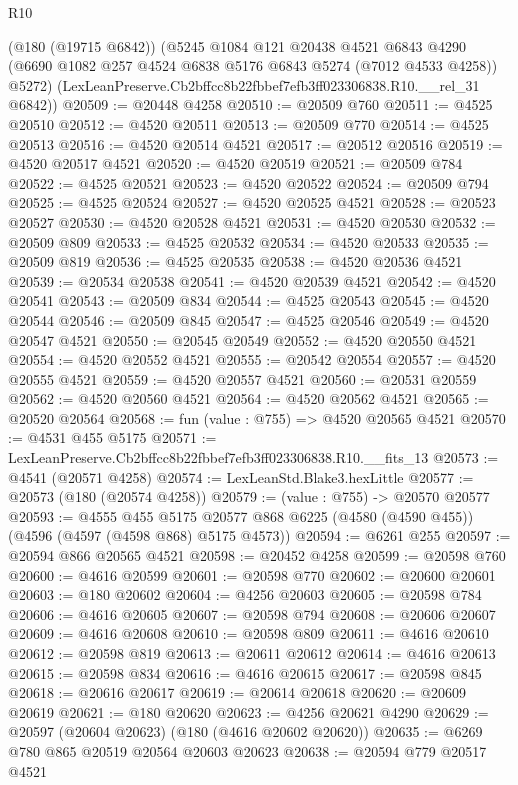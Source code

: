 \begin{lexlean}{R10}
\begin{coremodule}
      (@180 (@19715 @6842))
      (@5245
        @1084
        @121
        @20438
        @4521
        @6843
        @4290
        (@6690 @1082 @257 @4524 @6838 @5176 @6843 @5274 (@7012 @4533 @4258))
        @5272)
      (LexLeanPreserve.Cb2bffcc8b22fbbef7efb3ff023306838.R10.__rel_31 @6842))
@20509 := @20448 @4258
@20510 := @20509 @760
@20511 := @4525 @20510
@20512 := @4520 @20511
@20513 := @20509 @770
@20514 := @4525 @20513
@20516 := @4520 @20514 @4521
@20517 := @20512 @20516
@20519 := @4520 @20517 @4521
@20520 := @4520 @20519
@20521 := @20509 @784
@20522 := @4525 @20521
@20523 := @4520 @20522
@20524 := @20509 @794
@20525 := @4525 @20524
@20527 := @4520 @20525 @4521
@20528 := @20523 @20527
@20530 := @4520 @20528 @4521
@20531 := @4520 @20530
@20532 := @20509 @809
@20533 := @4525 @20532
@20534 := @4520 @20533
@20535 := @20509 @819
@20536 := @4525 @20535
@20538 := @4520 @20536 @4521
@20539 := @20534 @20538
@20541 := @4520 @20539 @4521
@20542 := @4520 @20541
@20543 := @20509 @834
@20544 := @4525 @20543
@20545 := @4520 @20544
@20546 := @20509 @845
@20547 := @4525 @20546
@20549 := @4520 @20547 @4521
@20550 := @20545 @20549
@20552 := @4520 @20550 @4521
@20554 := @4520 @20552 @4521
@20555 := @20542 @20554
@20557 := @4520 @20555 @4521
@20559 := @4520 @20557 @4521
@20560 := @20531 @20559
@20562 := @4520 @20560 @4521
@20564 := @4520 @20562 @4521
@20565 := @20520 @20564
@20568 := fun (value : @755) => @4520 @20565 @4521
@20570 := @4531 @455 @5175
@20571 := LexLeanPreserve.Cb2bffcc8b22fbbef7efb3ff023306838.R10.__fits_13
@20573 := @4541 (@20571 @4258)
@20574 := LexLeanStd.Blake3.hexLittle
@20577 := @20573 (@180 (@20574 @4258))
@20579 := (value : @755) -> @20570 @20577
@20593 := @4555
    @455
    @5175
    @20577
    @868
    @6225
    (@4580 (@4590 @455))
    (@4596 (@4597 (@4598 @868) @5175 @4573))
@20594 := @6261 @255
@20597 := @20594 @866 @20565 @4521
@20598 := @20452 @4258
@20599 := @20598 @760
@20600 := @4616 @20599
@20601 := @20598 @770
@20602 := @20600 @20601
@20603 := @180 @20602
@20604 := @4256 @20603
@20605 := @20598 @784
@20606 := @4616 @20605
@20607 := @20598 @794
@20608 := @20606 @20607
@20609 := @4616 @20608
@20610 := @20598 @809
@20611 := @4616 @20610
@20612 := @20598 @819
@20613 := @20611 @20612
@20614 := @4616 @20613
@20615 := @20598 @834
@20616 := @4616 @20615
@20617 := @20598 @845
@20618 := @20616 @20617
@20619 := @20614 @20618
@20620 := @20609 @20619
@20621 := @180 @20620
@20623 := @4256 @20621 @4290
@20629 := @20597 (@20604 @20623) (@180 (@4616 @20602 @20620))
@20635 := @6269 @780 @865 @20519 @20564 @20603 @20623
@20638 := @20594 @779 @20517 @4521

\end{coremodule}
\end{lexlean}
